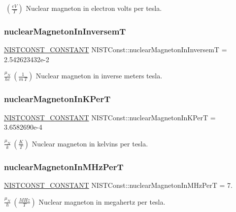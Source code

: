 $ \ (\frac{eV}{T})$ Nuclear magneton in electron volts per tesla. \mbox{\label{group___n_i_s_t_const-_nuclear_magneton_ga95d787bf5e84f595d848ac5a565f9742}} 
\subsubsection{\texorpdfstring{nuclear\+Magneton\+In\+InversemT}{nuclearMagnetonInInversemT}}
{\footnotesize\ttfamily \mbox{\hyperlink{group___n_i_s_t_const-_macros_ga2b0fc1d7452373f816175dd86ce26729}{N\+I\+S\+T\+C\+O\+N\+S\+T\+\_\+\+C\+O\+N\+S\+T\+A\+NT}} N\+I\+S\+T\+Const\+::nuclear\+Magneton\+In\+InversemT = 2.\+542623432e-\/2}

$\frac{\mu_N}{hc} \ (\frac{1}{m\ T})$ Nuclear magneton in inverse meters tesla. \mbox{\label{group___n_i_s_t_const-_nuclear_magneton_ga020f8bcfb39741d79ca59735c9b75e8e}} 
\subsubsection{\texorpdfstring{nuclear\+Magneton\+In\+K\+PerT}{nuclearMagnetonInKPerT}}
{\footnotesize\ttfamily \mbox{\hyperlink{group___n_i_s_t_const-_macros_ga2b0fc1d7452373f816175dd86ce26729}{N\+I\+S\+T\+C\+O\+N\+S\+T\+\_\+\+C\+O\+N\+S\+T\+A\+NT}} N\+I\+S\+T\+Const\+::nuclear\+Magneton\+In\+K\+PerT = 3.\+6582690e-\/4}

$\frac{\mu_N}{k} \ (\frac{K}{T})$ Nuclear magneton in kelvins per tesla. \mbox{\label{group___n_i_s_t_const-_nuclear_magneton_ga777ba2ca7adede57181646fb23e7bfc5}} 
\subsubsection{\texorpdfstring{nuclear\+Magneton\+In\+M\+Hz\+PerT}{nuclearMagnetonInMHzPerT}}
{\footnotesize\ttfamily \mbox{\hyperlink{group___n_i_s_t_const-_macros_ga2b0fc1d7452373f816175dd86ce26729}{N\+I\+S\+T\+C\+O\+N\+S\+T\+\_\+\+C\+O\+N\+S\+T\+A\+NT}} N\+I\+S\+T\+Const\+::nuclear\+Magneton\+In\+M\+Hz\+PerT = 7.}

$\frac{\mu_N}{h} \ (\frac{MHz}{T})$ Nuclear magneton in megahertz per tesla. 